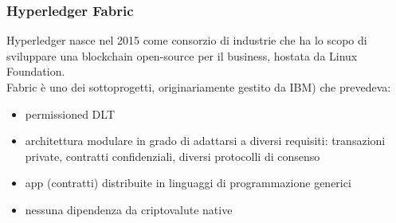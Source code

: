 \subsubsection{Hyperledger Fabric}
Hyperledger nasce nel 2015 come consorzio di industrie che ha lo scopo di sviluppare una blockchain open-source per il business, hostata da Linux Foundation.\\
Fabric è uno dei sottoprogetti, originariamente gestito da IBM) che prevedeva:
\begin{itemize}
    \item permissioned DLT
    \item architettura modulare in grado di adattarsi a diversi requisiti: transazioni private, contratti confidenziali, diversi protocolli di consenso
    \item app (contratti) distribuite in linguaggi di programmazione generici
    \item nessuna dipendenza da criptovalute native
\end{itemize}



